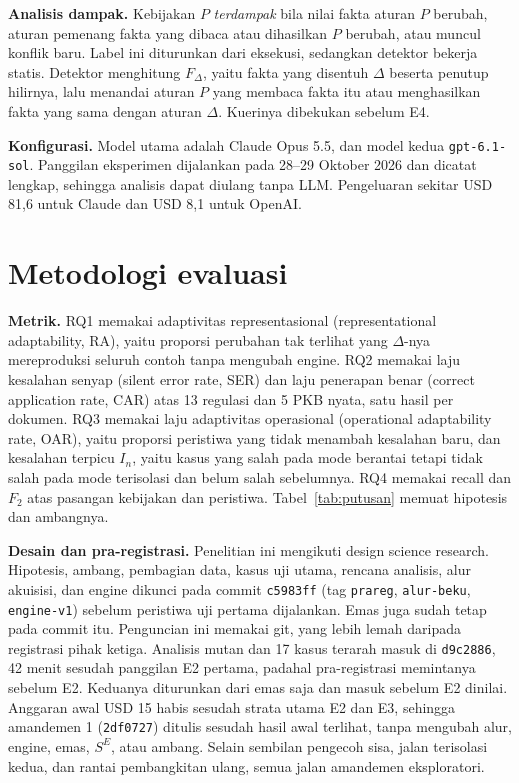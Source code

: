 \documentclass[conference]{IEEEtran}
\makeatletter
\DeclareRobustCommand{\en}[1]{{\usefont{\f@encoding}{\f@family}{\f@series}{it}#1\/}}
\newcommand{\SE}{S^{E}}
\makeatother
\begin{document}
\textbf{Analisis dampak.} Kebijakan $P$ \emph{terdampak} bila nilai fakta aturan $P$ berubah, aturan pemenang fakta yang dibaca atau dihasilkan $P$ berubah, atau muncul konflik baru. Label ini diturunkan dari eksekusi, sedangkan detektor bekerja statis. Detektor menghitung $F_\Delta$, yaitu fakta yang disentuh $\Delta$ beserta penutup hilirnya, lalu menandai aturan $P$ yang membaca fakta itu atau menghasilkan fakta yang sama dengan aturan $\Delta$. Kuerinya dibekukan sebelum E4.

\textbf{Konfigurasi.} Model utama adalah Claude Opus 5.5, dan model kedua \texttt{gpt-6.1-sol}. Panggilan eksperimen dijalankan pada 28--29 Oktober 2026 dan dicatat lengkap, sehingga analisis dapat diulang tanpa LLM. Pengeluaran sekitar USD 81,6 untuk Claude dan USD 8,1 untuk OpenAI.

\section{Metodologi evaluasi}
\label{sec:evaluasi}
\textbf{Metrik.} RQ1 memakai adaptivitas representasional (\en{representational adaptability}, RA), yaitu proporsi perubahan tak terlihat yang $\Delta$-nya mereproduksi seluruh contoh tanpa mengubah \en{engine}. RQ2 memakai laju kesalahan senyap (\en{silent error rate}, SER) dan laju penerapan benar (\en{correct application rate}, CAR) atas 13 regulasi dan 5 PKB nyata, satu hasil per dokumen. RQ3 memakai laju adaptivitas operasional (\en{operational adaptability rate}, OAR), yaitu proporsi peristiwa yang tidak menambah kesalahan baru, dan kesalahan terpicu $I_n$, yaitu kasus yang salah pada mode berantai tetapi tidak salah pada mode terisolasi dan belum salah sebelumnya. RQ4 memakai \en{recall} dan $F_2$ atas pasangan kebijakan dan peristiwa. Tabel~\ref{tab:putusan} memuat hipotesis dan ambangnya.

\textbf{Desain dan pra-registrasi.} Penelitian ini mengikuti \en{design science research}. Hipotesis, ambang, pembagian data, kasus uji utama, rencana analisis, alur akuisisi, dan \en{engine} dikunci pada \en{commit} \texttt{c5983ff} (\en{tag} \texttt{prareg}, \texttt{alur-beku}, \texttt{engine-v1}) sebelum peristiwa uji pertama dijalankan. Emas juga sudah tetap pada \en{commit} itu. Penguncian ini memakai git, yang lebih lemah daripada registrasi pihak ketiga. Analisis mutan dan 17 kasus terarah masuk di \texttt{d9c2886}, 42 menit sesudah panggilan E2 pertama, padahal pra-registrasi memintanya sebelum E2. Keduanya diturunkan dari emas saja dan masuk sebelum E2 dinilai. Anggaran awal USD 15 habis sesudah strata utama E2 dan E3, sehingga amandemen 1 (\texttt{2df0727}) ditulis sesudah hasil awal terlihat, tanpa mengubah alur, \en{engine}, emas, $\SE$, atau ambang. Selain sembilan pengecoh sisa, jalan terisolasi kedua, dan rantai pembangkitan ulang, semua jalan amandemen eksploratori.
\end{document}
